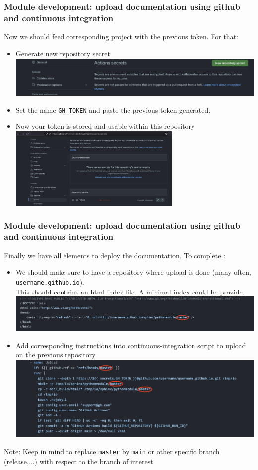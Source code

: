 \documentclass[8pt]{beamer}
\begin{document}
\begin{frame}
  \frametitle{Module development: upload documentation using github and continuous integration}
  Now we should feed corresponding project with the previous token. For that:

    \begin{itemize}
      \item Generate new repository secret
      \includegraphics[width=8.cm, height=2cm]{generate_new_rep.png}
      \item Set the name \texttt{GH\_TOKEN} and paste the previous token generated.
      \item Now your token is stored and usable within this repository
      \includegraphics[width=8.cm, height=4cm]{refer_token.png}
      \end{itemize}
\end{frame}

\begin{frame}
  \frametitle{Module development: upload documentation using github and continuous integration}
  Finally we have all elements to deploy the documentation. To complete :
    \begin{itemize} 
      \item We should make sure to have a repository where upload is done (many often, \texttt{username.github.io}).\\
       This should contains an html index file. A minimal index could be provide.
       \includegraphics[width=9.cm]{index_minimal.png}
      \item Add corresponding instructions into continuous-integration script to upload on the previous repository
      \includegraphics[width=9.cm]{instruction_ci.png}
    \end{itemize}
    Note: Keep in mind to replace \texttt{master} by \texttt{main} or other specific branch (release,...) with respect to the branch of interest.
\end{frame}
\end{document}
